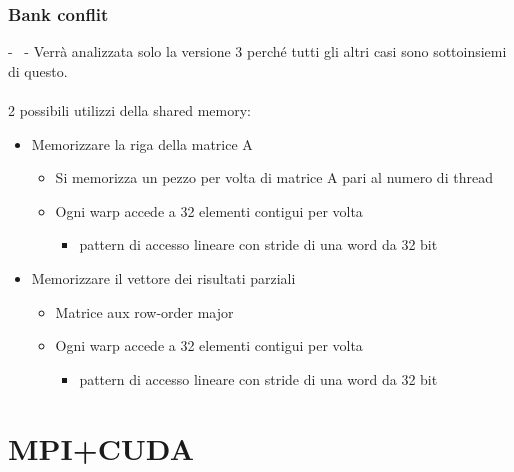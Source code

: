 \documentclass[compress]{beamer}
\begin{document}
\subsubsection*{Bank conflit}
\begin{frame}{\secname \text{ }- \subsecname\ \text{ }- \subsubsecname}
    Verrà analizzata solo la versione 3 perché tutti gli altri casi sono sottoinsiemi di questo.\\ \\
    2 possibili utilizzi della shared memory: 
    \begin{itemize}
        \item Memorizzare la riga della matrice A 
        \begin{itemize}
            \item Si memorizza un pezzo per volta di matrice A pari al numero di thread
            \item Ogni warp accede a 32 elementi contigui per volta
            \begin{itemize}
                \item pattern di accesso lineare con stride di una word da 32 bit
            \end{itemize}
        \end{itemize}
        \item Memorizzare il vettore dei risultati parziali
        \begin {itemize}
            \item Matrice aux row-order major
            \item Ogni warp accede a 32 elementi contigui per volta
            \begin{itemize}
                \item pattern di accesso lineare con stride di una word da 32 bit
            \end{itemize}
        \end{itemize}
    \end{itemize}
\end{frame}

\section{MPI+CUDA}
\end{document}
